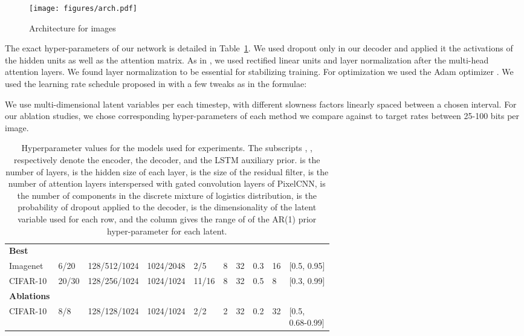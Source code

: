 \documentclass{article} \usepackage{iclr2019_conference,times}
\newcommand{\tblref}[1]{Table~\ref{#1}}
\begin{document}
\begin{figure}[h]
    \centering
    \texttt{[image: figures/arch.pdf]}
    \caption{Architecture for images}
    \label{fig:arch}
\end{figure}


The exact hyper-parameters of our network is detailed in \tblref{tbl:hyp}. We used dropout only in our decoder and applied it
the activations of the hidden units as well as the attention matrix. As in \citep{Vaswani2017}, we used rectified linear units and layer normalization \citep{layernorm} after the multi-head attention layers. We found layer normalization to be essential for stabilizing training. For optimization we used the Adam optimizer \citep{adam}. We used the learning rate schedule 
proposed in \citep{Vaswani2017} with a few tweaks as in the formulae:



    
We use multi-dimensional latent variables per each timestep, with different slowness factors linearly spaced between a chosen interval. For our ablation studies, we chose corresponding hyper-parameters of each method we compare against to target rates between 25-100 bits per image.

\begin{table}[h]
\centering
\begin{tabular}{@{}l|lllllllll@{}}
                    &   &  &  &  &  & &  &  & \\
\toprule
\textbf{Best} \\
Imagenet   & 6/20 & 128/512/1024 &  1024/2048 & 2/5 & 8 & 32 & 0.3 & 16 & [0.5, 0.95] \\
CIFAR-10     & 20/30 & 128/256/1024 &  1024/1024 & 11/16 & 8 & 32 & 0.5 & 8 & [0.3, 0.99] \\
\midrule
\textbf{Ablations} \\
CIFAR-10 & 8/8 & 128/128/1024 & 1024/1024 & 2/2 & 2 & 32 & 0.2 & 32 &\shortstack{[0.5, \\ 0.68-0.99]} \\
\bottomrule
\end{tabular}
\caption{Hyperparameter values for the models used for experiments. The subscripts , ,  respectively denote the encoder, the decoder, and the LSTM auxiliary prior.  is the number of layers,  is the hidden size of each layer,  is the size of the residual filter,  is the number of attention layers interspersed with gated convolution layers of PixelCNN,  is the number of components in the discrete mixture of logistics distribution,  is the probability of dropout applied to the decoder,  is the dimensionality of the latent variable used for each row, and the  column gives the range of of the AR(1) prior hyper-parameter for each latent.}\label{tbl:hyp}
\end{table}
\end{document}
